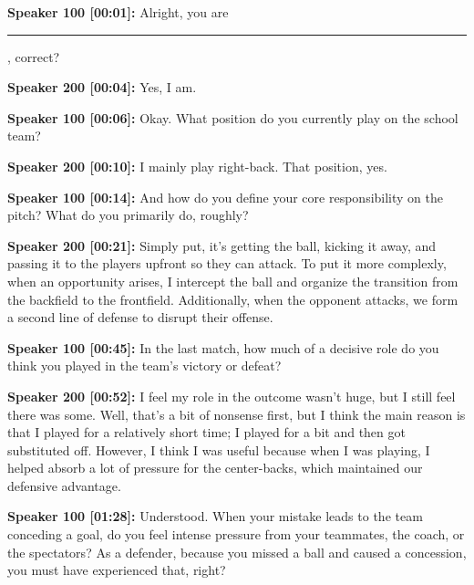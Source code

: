 \documentclass[11pt,a4paper]{article}
\newcommand{\redacted}{\rule{2.5cm}{2ex}}
\begin{document}
\begin{linenumbers}

\noindent \textbf{Speaker 100 [00:01]:} Alright, you are \redacted, correct? 

\vspace{0.5em}
\noindent \textbf{Speaker 200 [00:04]:} Yes, I am. 

\vspace{0.5em}
\noindent \textbf{Speaker 100 [00:06]:} Okay. What position do you currently play on the school team? 

\vspace{0.5em}
\noindent \textbf{Speaker 200 [00:10]:} I mainly play right-back. That position, yes. 

\vspace{0.5em}
\noindent \textbf{Speaker 100 [00:14]:} And how do you define your core responsibility on the pitch? What do you primarily do, roughly? 

\vspace{0.5em}
\noindent \textbf{Speaker 200 [00:21]:} Simply put, it's getting the ball, kicking it away, and passing it to the players upfront so they can attack. To put it more complexly, when an opportunity arises, I intercept the ball and organize the transition from the backfield to the frontfield. Additionally, when the opponent attacks, we form a second line of defense to disrupt their offense. 

\vspace{0.5em}
\noindent \textbf{Speaker 100 [00:45]:} In the last match, how much of a decisive role do you think you played in the team's victory or defeat? 

\vspace{0.5em}
\noindent \textbf{Speaker 200 [00:52]:} I feel my role in the outcome wasn't huge, but I still feel there was some. Well, that's a bit of nonsense first, but I think the main reason is that I played for a relatively short time; I played for a bit and then got substituted off. However, I think I was useful because when I was playing, I helped absorb a lot of pressure for the center-backs, which maintained our defensive advantage. 

\vspace{0.5em}
\noindent \textbf{Speaker 100 [01:28]:} Understood. When your mistake leads to the team conceding a goal, do you feel intense pressure from your teammates, the coach, or the spectators? As a defender, because you missed a ball and caused a concession, you must have experienced that, right? 


\end{linenumbers}
\end{document}
